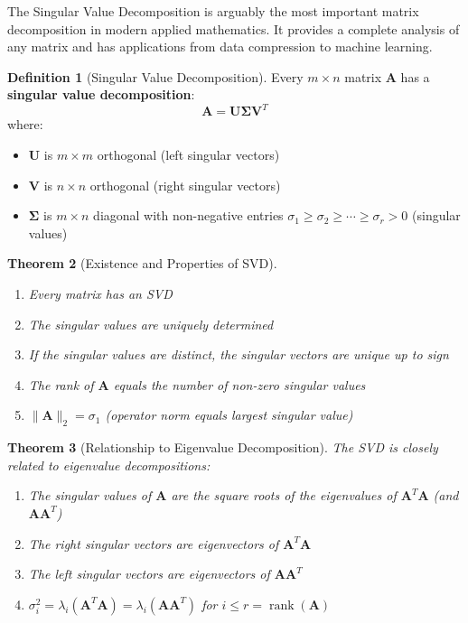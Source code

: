 \documentclass[12pt]{article}
\numberwithin{equation}{section}
\newcommand{\mat}[1]{\mathbf{#1}}        %
\newcommand{\rank}{\operatorname{rank}}
\theoremstyle{plain}
\newtheorem{theorem}{Theorem}[section]
\theoremstyle{definition}
\newtheorem{definition}[theorem]{Definition}
\theoremstyle{remark}
\begin{document}
The Singular Value Decomposition is arguably the most important matrix decomposition in modern applied mathematics. It provides a complete analysis of any matrix and has applications from data compression to machine learning.

\begin{definition}[Singular Value Decomposition]
Every $m \times n$ matrix $\mat{A}$ has a \textbf{singular value decomposition}:
$$\mat{A} = \mat{U}\mat{\Sigma}\mat{V}^T$$
where:
\begin{itemize}
\item $\mat{U}$ is $m \times m$ orthogonal (left singular vectors)
\item $\mat{V}$ is $n \times n$ orthogonal (right singular vectors)  
\item $\mat{\Sigma}$ is $m \times n$ diagonal with non-negative entries $\sigma_1 \geq \sigma_2 \geq \cdots \geq \sigma_r > 0$ (singular values)
\end{itemize}
\end{definition}

\begin{theorem}[Existence and Properties of SVD]
\begin{enumerate}
\item Every matrix has an SVD
\item The singular values are uniquely determined
\item If the singular values are distinct, the singular vectors are unique up to sign
\item The rank of $\mat{A}$ equals the number of non-zero singular values
\item $\|\mat{A}\|_2 = \sigma_1$ (operator norm equals largest singular value)
\end{enumerate}
\end{theorem}

\begin{theorem}[Relationship to Eigenvalue Decomposition]
The SVD is closely related to eigenvalue decompositions:
\begin{enumerate}
\item The singular values of $\mat{A}$ are the square roots of the eigenvalues of $\mat{A}^T\mat{A}$ (and $\mat{A}\mat{A}^T$)
\item The right singular vectors are eigenvectors of $\mat{A}^T\mat{A}$
\item The left singular vectors are eigenvectors of $\mat{A}\mat{A}^T$
\item $\sigma_i^2 = \lambda_i(\mat{A}^T\mat{A}) = \lambda_i(\mat{A}\mat{A}^T)$ for $i \leq r = \rank(\mat{A})$
\end{enumerate}
\end{theorem}
\end{document}
